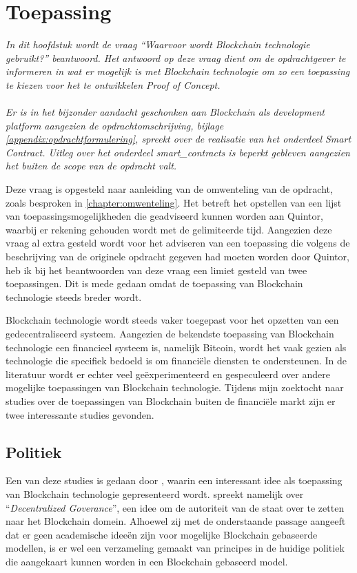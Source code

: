 \section{Toepassing}

\textit{In dit hoofdstuk wordt de vraag ``Waarvoor wordt Blockchain technologie gebruikt?'' beantwoord. Het antwoord op deze vraag dient om de opdrachtgever te informeren in wat er mogelijk is met Blockchain technologie om zo een toepassing te kiezen voor het te ontwikkelen Proof of Concept. \\ \\ Er is in het bijzonder aandacht geschonken aan Blockchain als development platform aangezien de opdrachtomschrijving, bijlage \ref{appendix:opdrachtformulering}, spreekt over de realisatie van het onderdeel Smart Contract. Uitleg over het onderdeel \glspl{smart_contract} is beperkt gebleven aangezien het buiten de scope van de opdracht valt.}

Deze vraag is opgesteld naar aanleiding van de omwenteling van de opdracht, zoals besproken in \ref{chapter:omwenteling}. Het betreft het opstellen van een lijst van toepassingsmogelijkheden die geadviseerd kunnen worden aan Quintor, waarbij er rekening gehouden wordt met de gelimiteerde tijd. Aangezien deze vraag al extra gesteld wordt voor het adviseren van een toepassing die volgens de beschrijving van de originele opdracht gegeven had moeten worden door Quintor, heb ik bij het beantwoorden van deze vraag een limiet gesteld van twee toepassingen. Dit is mede gedaan omdat de toepassing van Blockchain technologie steeds breder wordt.

Blockchain technologie wordt steeds vaker toegepast voor het opzetten van een gedecentraliseerd systeem. Aangezien de bekendste toepassing van Blockchain technologie een financieel systeem is, namelijk Bitcoin, wordt het vaak gezien als technologie die specifiek bedoeld is om financiële diensten te ondersteunen. In de literatuur wordt er echter veel geëxperimenteerd en gespeculeerd over andere mogelijke toepassingen van Blockchain technologie. Tijdens mijn zoektocht naar studies over de toepassingen van Blockchain buiten de financiële markt zijn er twee interessante studies gevonden.

\subsection{Politiek}
Een van deze studies is gedaan door \cite{atzori2015blockchain}, waarin een interessant idee als toepassing van Blockchain technologie gepresenteerd wordt. \citeauthor{atzori2015blockchain} spreekt namelijk over ``\textit{Decentralized Goverance}'', een idee om de autoriteit van de staat over te zetten naar het Blockchain domein. Alhoewel zij met de onderstaande passage aangeeft dat er geen academische ideeën zijn voor mogelijke Blockchain gebaseerde modellen, is er wel een verzameling gemaakt van principes in de huidige politiek die aangekaart kunnen worden in een Blockchain gebaseerd model. \\

